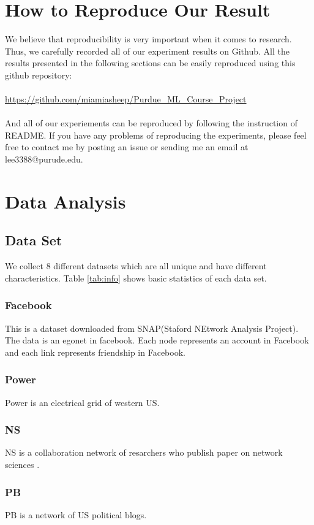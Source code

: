 \documentclass[12pt]{article}
\begin{document}
\section{How to Reproduce Our Result}
We believe that reproducibility is very important when it comes to research. Thus, we carefully recorded all of our experiment results on Github. All the results presented in the following sections can be easily reproduced using this github repository: 
\\
\\
\url{https://github.com/miamiasheep/Purdue\_ML\_Course\_Project}
\\
\\
And all of our experiements can be reproduced by following the instruction of README. If you have any problems of reproducing the experiments, please feel free to contact me by posting an issue or sending me an email at lee3388@purude.edu.

\section{Data Analysis}

\subsection {Data Set}
We collect 8 different datasets which are all unique and have different characteristics. Table \ref{tab:info} shows basic statistics of each data set.
\subsubsection{Facebook}
This is a dataset downloaded from SNAP(Staford NEtwork Analysis Project)\cite{snapnets}. The data is an egonet in facebook. Each node represents an account in Facebook and each link represents friendship in Facebook.
\subsubsection{Power}
Power is  an electrical grid of western US\cite{small_world}.
\subsubsection{NS}
NS is a collaboration network of resarchers who publish paper on network sciences \cite{Newman_2006}.
\subsubsection{PB}
PB is a network of US political blogs.\cite{pb}
\end{document}
